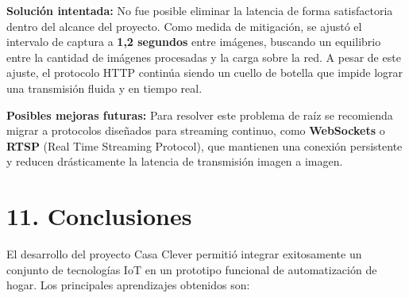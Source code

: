 \documentclass[12pt, a4paper]{report}
\begin{document}
\textbf{Solución intentada:} No fue posible eliminar la latencia de forma satisfactoria dentro del alcance del proyecto. Como medida de mitigación, se ajustó el intervalo de captura a \textbf{1{,}2 segundos} entre imágenes, buscando un equilibrio entre la cantidad de imágenes procesadas y la carga sobre la red. A pesar de este ajuste, el protocolo HTTP continúa siendo un cuello de botella que impide lograr una transmisión fluida y en tiempo real.

\textbf{Posibles mejoras futuras:} Para resolver este problema de raíz se recomienda migrar a protocolos diseñados para streaming continuo, como \textbf{WebSockets} o \textbf{RTSP} (Real Time Streaming Protocol), que mantienen una conexión persistente y reducen drásticamente la latencia de transmisión imagen a imagen.

\chapter*{11. Conclusiones}

El desarrollo del proyecto Casa Clever permitió integrar exitosamente un conjunto de tecnologías IoT en un prototipo funcional de automatización de hogar. Los principales aprendizajes obtenidos son:
\end{document}
